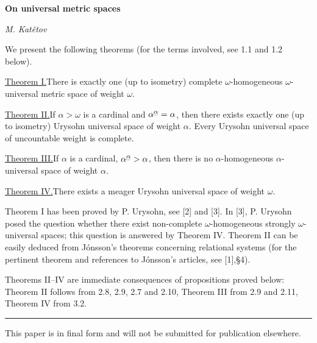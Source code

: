 \documentclass[12pt,a4paper]{article}
\newcommand{\suprexp}[1]{\underaccent{\smile}{#1}}
\begin{document}
\setcounter{page}{323}
\thispagestyle{fancy}
\fancyhead[C]{}
\fancyhead[R]{\thepage}
\vspace{12mm}
\begin{center}
{\large\bfseries On universal metric spaces}\par
\vspace{7mm}
\textit{M. Kat\v{e}tov}
\end{center}
\vspace{10mm}
We present the following theorems (for the terms involved, see 1.1 and 1.2 below).

\par\noindent\underline{Theorem I.}\enspace There is exactly one (up to isometry) complete $\omega$-homogeneous $\omega$-universal metric space of weight $\omega$.

\par\noindent\underline{Theorem II.}\enspace If $\alpha>\omega$ is a cardinal and $\alpha^{\suprexp{\alpha}}=\alpha$, then there exists exactly one (up to isometry) Urysohn universal space of weight $\alpha$. Every Urysohn universal space of uncountable weight is complete.

\par\noindent\underline{Theorem III.}\enspace If $\alpha$ is a cardinal, $\alpha^{\suprexp{\alpha}}>\alpha$, then there is no $\alpha$-homogeneous $\alpha$-universal space of weight $\alpha$.

\par\noindent\underline{Theorem IV.}\enspace There exists a meager Urysohn universal space of weight $\omega$.

Theorem I has been proved by P. Urysohn, see [2] and [3]. In [3], P. Urysohn posed the question whether there exist non-complete $\omega$-homogeneous strongly $\omega$-universal spaces; this question is answered by Theorem IV. Theorem II can be easily deduced from J\'onsson's theorems concerning relational systems (for the pertinent theorem and references to J\'onsson's articles, see [1],\S4).

Theorems II--IV are immediate consequences of propositions proved below: Theorem II follows from 2.8, 2.9, 2.7 and 2.10, Theorem III from 2.9 and 2.11, Theorem IV from 3.2.
\vfill
\noindent\rule{30mm}{0.4pt}\par
\noindent\footnotesize This paper is in final form and will not be submitted for publication elsewhere.\normalsize
\end{document}

